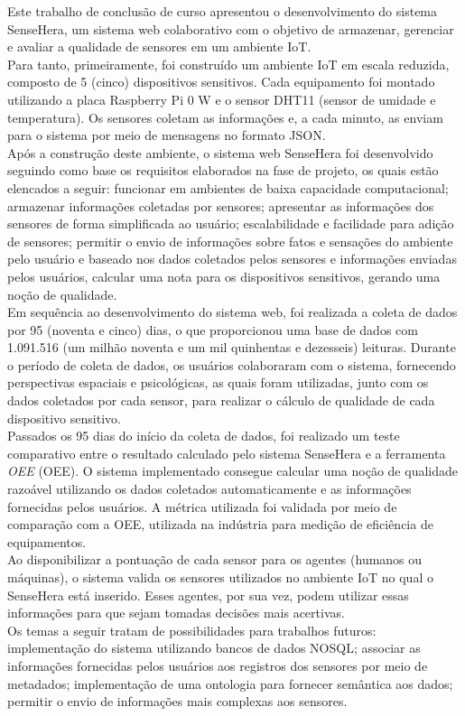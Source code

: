 \null \quad Este trabalho de conclusão de curso apresentou o desenvolvimento do sistema SenseHera, um sistema web colaborativo com o objetivo de armazenar, gerenciar e avaliar a qualidade de sensores em um ambiente \acrlong{IoT}.
\\\null \quad Para tanto, primeiramente, foi construído um ambiente \acrshort{IoT} em escala reduzida, composto de 5 (cinco) dispositivos sensitivos. Cada equipamento foi montado utilizando a placa Raspberry Pi 0 W e o sensor DHT11 (sensor de umidade e temperatura). Os sensores coletam as informações e, a cada minuto, as enviam para o sistema por meio de mensagens no formato JSON.
\\\null \quad Após a construção deste ambiente, o sistema web SenseHera foi desenvolvido seguindo como base os requisitos elaborados na fase de projeto, os quais estão elencados a seguir: funcionar em ambientes de baixa capacidade computacional; armazenar informações coletadas por sensores; apresentar as informações dos sensores de forma simplificada ao usuário; escalabilidade e facilidade para adição de sensores; permitir o envio de informações sobre fatos e sensações do ambiente pelo usuário e baseado nos dados coletados pelos sensores e informações enviadas pelos usuários, calcular uma nota para os dispositivos sensitivos, gerando uma noção de qualidade.
\\\null \quad Em sequência ao desenvolvimento do sistema web, foi realizada a coleta de dados por 95 (noventa e cinco) dias, o que proporcionou uma base de dados com 1.091.516 (um milhão noventa e um mil quinhentas e dezesseis) leituras. Durante o período de coleta de dados, os usuários colaboraram com o sistema, fornecendo perspectivas espaciais e psicológicas, as quais foram utilizadas, junto com os dados coletados por cada sensor, para realizar o cálculo de qualidade de cada dispositivo sensitivo.
 \\\null \quad Passados os 95 dias do início da coleta de dados, foi realizado um teste comparativo entre o resultado calculado pelo sistema SenseHera e a ferramenta \textit{\acrlong{OEE}} (\acrshort{OEE}).
 O sistema implementado consegue calcular uma noção de qualidade razoável utilizando os dados coletados automaticamente e as informações fornecidas pelos usuários. A métrica utilizada foi validada por meio de comparação com a \acrshort{OEE}, utilizada na indústria para medição de eficiência de equipamentos.
 \\\null\quad Ao disponibilizar a pontuação de cada sensor para os agentes (humanos ou máquinas), o sistema valida os sensores utilizados no ambiente \acrshort{IoT} no qual o SenseHera está inserido. Esses agentes, por sua vez, podem utilizar essas informações para que sejam tomadas decisões mais acertivas.
\\\null \quad Os temas a seguir tratam de possibilidades para trabalhos futuros: implementação do sistema utilizando bancos de dados NOSQL; associar as informações fornecidas pelos usuários aos registros dos sensores por meio de metadados; implementação de uma ontologia para fornecer semântica aos dados; permitir o envio de informações mais complexas aos sensores.

